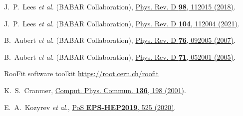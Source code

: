 \documentclass[twocolumn,aps,prd,floatfix,nofootinbib,superscriptaddress]{revtex4-2}
\begin{document}
\begin{thebibliography}{9}

J.~P.~Lees \textit{et al.} (BABAR Collaboration),
\href{https://doi.org/10.1103/PhysRevD.98.112015}
{Phys. Rev. D \textbf{98}, 112015 (2018)}.

J.~P.~Lees \textit{et al.} (BABAR Collaboration),
\href{https://doi.org/10.1103/PhysRevD.104.112004}
{Phys. Rev. D \textbf{104}, 112004 (2021)}.

B.~Aubert \textit{et al.} (BABAR Collaboration),
\href{https://doi.org/10.1103/PhysRevD.76.092005}
{Phys. Rev. D \textbf{76}, 092005 (2007)}.

B.~Aubert \textit{et al.} (BABAR Collaboration),
\href{https://doi.org/10.1103/PhysRevD.71.052001}
{Phys. Rev. D \textbf{71}, 052001 (2005)}.


RooFit software toolkit \url{https://root.cern.ch/roofit}

K.~S.~Cranmer,
\href{https://doi.org/10.1016/S0010-4655(00)00243-5}
{Comput. Phys. Commun. \textbf{136}, 198 (2001)}.

E.~A.~Kozyrev \textit{et al.},
\href{https://doi.org/10.22323/1.364.0525}
{PoS \textbf{EPS-HEP2019}, 525 (2020)}.



\end{thebibliography}
\end{document}
